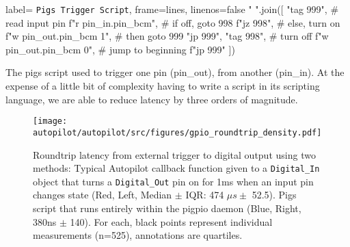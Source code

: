 \begin{marginfigure}[-10cm]
\begin{pythoncode*}{
label= \texttt{Pigs Trigger Script},
frame=lines,
linenos=false}
" ".join([
  "tag 999",
  # read input pin
  f"r {pin_in.pin_bcm}",
  # if off, goto 998
  f"jz 998", 
  # else, turn on
  f"w {pin_out.pin_bcm} 1",
  # then goto 999
  "jp 999", 
  "tag 998",
  # turn off
  f"w {pin_out.pin_bcm} 0",
  # jump to beginning
  f"jp 999"
])
\end{pythoncode*}
\caption{The pigs script used to trigger one pin (pin\_out), from another (pin\_in). At the expense of a little bit of complexity having to write a script in its scripting language, we are able to reduce latency by three orders of magnitude.}
\label{fig:pigsscript}
\end{marginfigure}


\begin{figure}[hb!]
\caption{Roundtrip latency from external trigger to digital output using two methods: Typical Autopilot callback function given to a \texttt{Digital\_In} object that turns a \texttt{Digital\_Out} pin on for 1ms when an input pin changes state (Red, Left, Median $\pm$ IQR: 474 $\mu s \pm$ 52.5). Pigs script that runs entirely within the pigpio daemon (Blue, Right, 380ns $\pm$ 140). For each, black points represent individual measurements (n=525), annotations are quartiles.}
\label{fig:gpiort}
\texttt{[image: autopilot/autopilot/src/figures/gpio\_roundtrip\_density.pdf]}
\end{figure}

\clearpage


